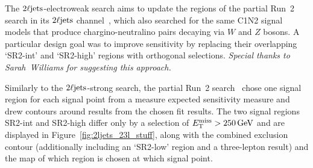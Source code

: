 The $\twoljets$-electroweak search aims to
update the regions of the partial Run~2 search in its $\twoljets$
channel~\cite{atlas_23l_SUSY_2016_24}, which also searched for the same C1N2
signal models that produce chargino-neutralino pairs decaying via $W$ and $Z$
bosons.
A particular design goal was to improve sensitivity by replacing their overlapping
`SR2-int' and `SR2-high' regions with orthogonal selections.
\emph{Special thanks to Sarah~Williams for suggesting this approach.}

Similarly to the $\twoljets$-strong search, the partial Run~2
search~\cite{atlas_23l_SUSY_2016_24} chose one signal region for each signal
point from a measure expected sensitivity measure and drew contours around
results from the chosen fit results.
The two signal regions SR2-int and SR2-high differ only by a selection of
$\met > 250\,\eV[G]$ and are displayed in Figure~\ref{fig:2ljets_23l_stuff},
along with the combined exclusion contour (additionally including an `SR2-low'
region and a three-lepton result) and the map of which region is chosen at
which signal point.

